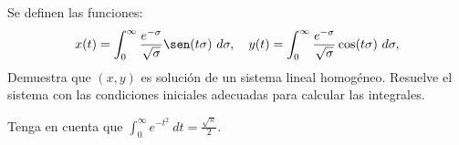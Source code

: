 \begin{ejercicio}\label{ej:5.6}
    Se definen las funciones:
    \[
        x(t) = \int_0^\infty \frac{e^{-\sigma}}{\sqrt{\sigma}}\sen(t\sigma)~d\sigma, \quad y(t) = \int_0^\infty \frac{e^{-\sigma}}{\sqrt{\sigma}}\cos(t\sigma)~d\sigma,
    \]
    Demuestra que $(x, y)$ es solución de un sistema lineal homogéneo. Resuelve el sistema con las condiciones iniciales adecuadas para calcular las integrales.
    \begin{observacion}
        Tenga en cuenta que
        $\displaystyle \int_0^\infty e^{-t^2}~dt = \frac{\sqrt{\pi}}{2}$.
    \end{observacion}

\begin{comment}
    El integrando de ambas funciones es una función de clase $C^1$ (puesto que el denominador no se anula). Por la derivación de las integrales dependientes de un parámetro, tenemos que:
    \begin{align*}
        x'(t) &= \int_0^\infty \frac{\partial}{\partial t}\left(\frac{e^{-\sigma}}{\sqrt{\sigma}}\sen(t\sigma)\right)~d\sigma
        = \int_0^\infty \frac{-\sigma e^{-\sigma}}{\sqrt{\sigma}}\cos(t\sigma)~d\sigma
        = -\int_0^\infty \sqrt{\sigma}e^{-\sigma}\cos(t\sigma)~d\sigma
    \end{align*}
\end{comment}
\end{ejercicio}

